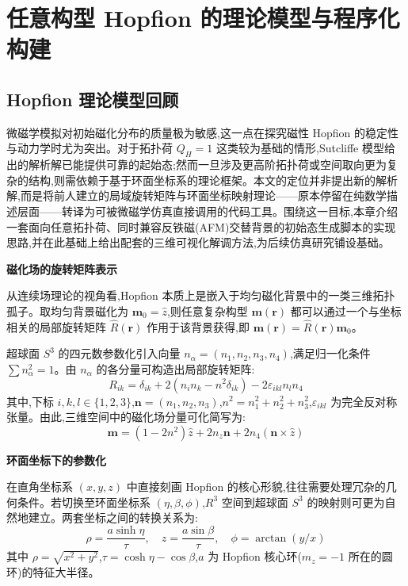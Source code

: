 \chapter{任意构型 Hopfion 的理论模型与程序化构建}

\section{Hopfion 理论模型回顾}

微磁学模拟对初始磁化分布的质量极为敏感,这一点在探究磁性 Hopfion 的稳定性与动力学时尤为突出。对于拓扑荷 $Q_H=1$ 这类较为基础的情形,Sutcliffe 模型给出的解析解已能提供可靠的起始态;然而一旦涉及更高阶拓扑荷或空间取向更为复杂的结构,则需依赖于基于环面坐标系的理论框架\cite{guslienko2025magnetic}。本文的定位并非提出新的解析解,而是将前人建立的局域旋转矩阵与环面坐标映射理论——原本停留在纯数学描述层面——转译为可被微磁学仿真直接调用的代码工具。围绕这一目标,本章介绍一套面向任意拓扑荷、同时兼容反铁磁(AFM)交替背景的初始态生成脚本的实现思路,并在此基础上给出配套的三维可视化解调方法,为后续仿真研究铺设基础。

\par\noindent\textbf{磁化场的旋转矩阵表示}\par\nobreak
从连续场理论的视角看,Hopfion 本质上是嵌入于均匀磁化背景中的一类三维拓扑孤子。取均匀背景磁化为 $\mathbf{m}_0 = \hat{z}$,则任意复杂构型 $\mathbf{m}(\mathbf{r})$ 都可以通过一个与坐标相关的局部旋转矩阵 $\hat{R}(\mathbf{r})$ 作用于该背景获得,即 $\mathbf{m}(\mathbf{r}) = \hat{R}(\mathbf{r}) \mathbf{m}_0$。

超球面 $S^3$ 的四元数参数化引入向量 $n_\alpha = (n_1, n_2, n_3, n_4)$,满足归一化条件 $\sum n_\alpha^2 = 1$。由 $n_\alpha$ 的各分量可构造出局部旋转矩阵:
\begin{equation}
    R_{ik} = \delta_{ik} + 2(n_i n_k - n^2 \delta_{ik}) - 2\varepsilon_{ikl} n_l n_4
\end{equation}
其中,下标 $i, k, l \in \{1,2,3\}$,$\mathbf{n} = (n_1, n_2, n_3)$,$n^2 = n_1^2 + n_2^2 + n_3^2$,$\varepsilon_{ikl}$ 为完全反对称张量。由此,三维空间中的磁化场分量可化简写为:
\begin{equation}
    \mathbf{m} = (1 - 2n^2)\hat{z} + 2n_z \mathbf{n} + 2n_4(\mathbf{n} \times \hat{z})
    \label{eq:hopf_magnetization}
\end{equation}

\par\noindent\textbf{环面坐标下的参数化}\par\nobreak
在直角坐标系 $(x,y,z)$ 中直接刻画 Hopfion 的核心形貌,往往需要处理冗杂的几何条件。若切换至环面坐标系 $(\eta, \beta, \phi)$,$R^3$ 空间到超球面 $S^3$ 的映射则可更为自然地建立。两套坐标之间的转换关系为:
\begin{equation}
    \rho = \frac{a \sinh \eta}{\tau}, \quad z = \frac{a \sin \beta}{\tau}, \quad \phi = \arctan(y/x)
\end{equation}
其中 $\rho = \sqrt{x^2+y^2}$,$\tau = \cosh \eta - \cos \beta$,$a$ 为 Hopfion 核心环($m_z=-1$ 所在的圆环)的特征大半径。

